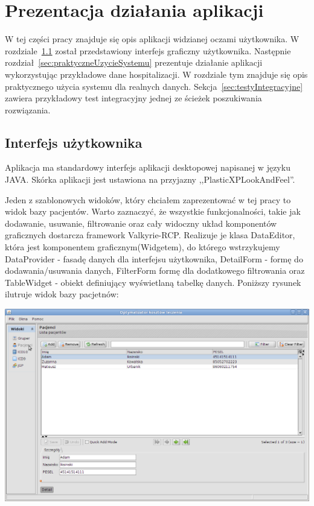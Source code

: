\chapter{Prezentacja działania aplikacji}
\label{cha:prezentacja}

W tej części pracy znajduje się opis aplikacji widzianej oczami użytkownika. W rozdziale~\ref{sec:interfejsUzytkownika} został
przedstawiony interfejs graficzny użytkownika. Następnie rozdział~\ref{sec:praktyczneUzycieSystemu} prezentuje działanie aplikacji wykorzystując przykładowe dane hospitalizacji. W rozdziale tym znajduje się opis praktycznego użycia systemu dla realnych danych. Sekcja~\ref{sec:testyIntegracyjne} zawiera przykładowy test integracyjny jednej ze ścieżek poszukiwania rozwiązania.


\section{Interfejs użytkownika}
\label{sec:interfejsUzytkownika}
Aplikacja ma standardowy interfejs aplikacji desktopowej napisanej w języku JAVA. Skórka aplikacji jest ustawiona na przyjazny ,,PlasticXPLookAndFeel''.

Jeden z szablonowych widoków, który chciałem zaprezentować w tej pracy to widok bazy pacjentów. Warto zaznaczyć, że wszystkie funkcjonalności, takie jak dodawanie, usuwanie, filtrowanie oraz cały widoczny układ komponentów graficznych dostarcza framework Valkyrie-RCP. Realizuje je klasa DataEditor, która jest komponentem graficznym(Widgetem), do którego wstrzykujemy DataProvider - fasadę danych dla interfejsu użytkownika, DetailForm - formę do dodawania/usuwania danych, FilterForm formę dla dodatkowego filtrowania oraz TableWidget - obiekt definiujący wyświetlaną tabelkę danych. Poniższy rysunek ilutruje widok bazy pacjetnów:

\includegraphics[scale=0.4]{images/patient} 

